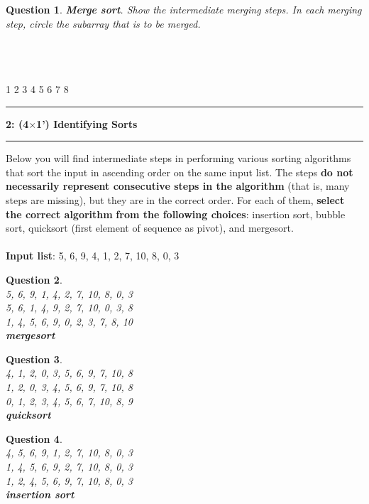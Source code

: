 \documentclass{article}
\newcommand\question[2]{\vspace{.25in}\hrule\textbf{#1: #2}\vspace{.5em}\hrule\vspace{.10in}}
\newtheorem{Q}{Question}
\begin{document}
\begin{Q}\textbf{Merge sort}. Show the intermediate merging steps. In each merging step, circle the subarray that is to be merged.
\end{Q}
       \\
   \\
 \\
1 2 3 4 5 6 7 8

\pagebreak

\question{2}{(4$\times$1') Identifying Sorts}
Below you will find intermediate steps in performing various sorting algorithms that sort the input in ascending order on the same input list. The steps \textbf{do not necessarily represent consecutive steps in the algorithm} (that is, many steps are missing), but they are in the correct order. For each of them, \textbf{select the correct algorithm} \textbf{from the
	following choices}: insertion sort, bubble sort, quicksort (first element of sequence as pivot), and mergesort.
\\\\
\textbf{Input list}: 5, 6, 9, 4, 1, 2, 7, 10, 8, 0, 3


\begin{Q} \textcolor{white}{ }\\
	5, 6, 9, 1, 4, 2, 7, 10, 8, 0, 3\\
	5, 6, 1, 4, 9, 2, 7, 10, 0, 3, 8\\
	1, 4, 5, 6, 9, 0, 2, 3, 7, 8, 10\\
	\textbf{mergesort}
	\vspace{1cm}
\end{Q}

\begin{Q}\textcolor{white}{ }\\
	4, 1, 2, 0, 3, 5, 6, 9, 7, 10, 8\\
	1, 2, 0, 3, 4, 5, 6, 9, 7, 10, 8\\
	0, 1, 2, 3, 4, 5, 6, 7, 10, 8, 9\\
	\textbf{quicksort}
	\vspace{1cm}
\end{Q}

\begin{Q}\textcolor{white}{ }\\
	4, 5, 6, 9, 1, 2, 7, 10, 8, 0, 3\\
	1, 4, 5, 6, 9, 2, 7, 10, 8, 0, 3\\
	1, 2, 4, 5, 6, 9, 7, 10, 8, 0, 3\\
	\textbf{insertion sort}
	\vspace{1cm}
\end{Q}
\end{document}
